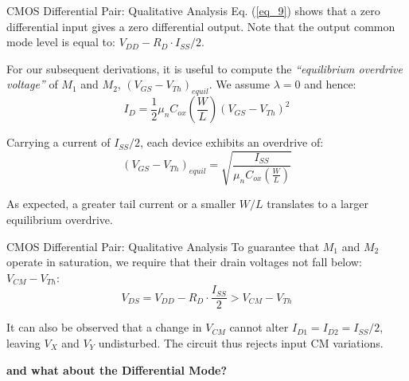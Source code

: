 \documentclass[10pt]{beamer}
\begin{document}
\begin{frame}{CMOS Differential Pair: Qualitative Analysis}
    Eq. (\ref{eq_9}) shows that a zero differential input gives a zero differential output. Note that the output common mode level is equal to: $V_{DD} - R_{D} \cdot I_{SS}/2 $.
    
    For our subsequent derivations, it is useful to compute the \textit{“equilibrium overdrive voltage”} of $M_{1}$ and $M_{2}$, $(V_{GS} - V_{Th})_{equil}$. We assume $\lambda = 0$ and hence:
    \begin{equation}
        I_{D} = \frac{1}{2} \mu_{n} C_{ox} \left(\frac{W}{L}\right) (V_{GS} - V_{Th})^{2}
        \label{eq_10}
    \end{equation}
    
    Carrying a current of $I_{SS}/2$, each device exhibits an overdrive of:
    \begin{equation}
        (V_{GS} - V_{Th})_{equil} = \sqrt{\frac{I_{SS}}{\mu_{n} C_{ox} \left(\frac{W}{L}\right)}} 
        \label{eq_11}
    \end{equation}
    
    As expected, a greater tail current or a smaller $W/L$ translates to a larger equilibrium
    overdrive.
\end{frame}



\begin{frame}{CMOS Differential Pair: Qualitative Analysis}
    To guarantee that $M_{1}$ and $M_{2}$ operate in saturation, we require that their drain voltages
    not fall below: $V_{CM} - V_{Th}$:
    \begin{equation}
        V_{DS} = V_{DD} - R_{D} \cdot \frac{I_{SS}}{2} > V_{CM} - V_{Th}
        \label{eq_12}
    \end{equation}
    
    It can also be observed that a change in $V_{CM}$ cannot alter $I_{D1} = I_{D2} = I_{SS}/2$, leaving $V_{X}$ and $V_{Y}$ undisturbed. The circuit thus rejects input CM variations.
    
    \vspace{1cm}
    \begin{center}
        \textbf{and what about the Differential Mode?}
    \end{center}
\end{frame}
\end{document}
